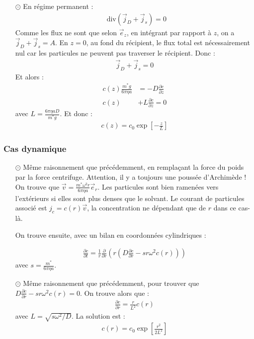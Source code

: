 \documentclass{report}
\newcommand*\diver{\mathop{}\!\mathrm{div}}
\begin{document}
\begin{itemize}
	\item[$\odot$] En régime permanent : 
	\begin{align*}
		\diver(\vec{j}_D+\vec{j}_s)=0
	\end{align*}
	Comme les flux ne sont que selon $\vec{e}_z$, en intégrant par rapport à $z$, on a $\vec{j}_D+\vec{j}_s=A$. En $z=0$, au fond du récipient, le flux total est nécessairement nul car les particules ne peuvent pas traverser le récipient. Donc :
	\begin{align*}
		\vec{j}_D+\vec{j}_s=0
	\end{align*}
	Et alors :
	\begin{align*}
		c(z)\frac{m^*g}{6\pi\eta a} &= -D\frac{\partial c}{\partial z} \\
		c(z) &+ L\frac{\partial c}{\partial z}=0
	\end{align*}
	avec $L=\frac{6\pi\eta aD}{m^*g}$.
	Et donc :
	\begin{align*}
		c(z)=c_0\exp\left[-\frac{z}{L} \right] 
	\end{align*}
	
\end{itemize}

\subsubsection*{Cas dynamique}

\begin{itemize}

	\item[$\odot$] Même raisonnement que précédemment, en remplaçant la force du poids par la force centrifuge. Attention, il y a toujours une poussée d'Archimède ! On trouve que $\vec{v}=\frac{m^*\omega^2 r}{6\pi\eta a}\vec{e}_r$. Les particules sont bien ramenées vers l'extérieurs si elles sont plus denses que le solvant. Le courant de particules associé est $j_c=c(r)\vec{v}$, la concentration ne dépendant que de $r$ dans ce cas-là.
	
	On trouve ensuite, avec un bilan en coordonnées cylindriques :

	\begin{align*}
		\frac{\partial c}{\partial t}=\frac{1}{r}\frac{\partial }{\partial r}\left(r\left(D\frac{\partial c}{\partial r} -sr\omega^2c(r) \right) \right)
	\end{align*}
	avec $s=\frac{m^*}{6\pi\eta a}$. 
	
	\item[$\odot$] Même raisonnement que précédemment, pour trouver que $D\frac{\partial c}{\partial r} -sr\omega^2c(r)=0$.
	On trouve alors que :
	\begin{align*}
	 \frac{\partial c}{\partial r}=\frac{r}{L^2}c(r)
	\end{align*}
	avec $L=\sqrt{s\omega^2/D}$.
	La solution est :
	\begin{align*}
		c(r)=c_0\exp\left[\frac{r^2}{2L^2} \right] 
	\end{align*}

\end{itemize}
\end{document}
